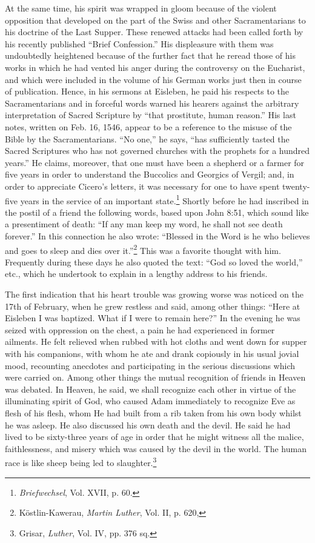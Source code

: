 At the same time, his spirit was wrapped in gloom because of the
violent opposition that developed on the part of the Swiss and other
Sacramentarians to his doctrine of the Last Supper. These renewed
attacks had been called forth by his recently published “Brief Confession.”
His displeasure with them was undoubtedly heightened because of the
further fact that he reread those of his works in which
he had vented his anger during the controversy on the Eucharist,
and which were included in the volume of his German works just then
in course of publication. Hence, in his sermons at Eisleben, he paid
his respects to the Sacramentarians and in forceful words warned
his hearers against the arbitrary interpretation of Sacred Scripture
by “that prostitute, human reason.” His last notes, written on Feb.
16, 1546, appear to be a reference to the misuse of the Bible by the
Sacramentarians. “No one,” he says, “has sufficiently tasted the Sacred
Scriptures who has not governed churches with the prophets for a
hundred years.” He claims, moreover, that one must have been a
shepherd or a farmer for five years in order to understand the Buccolics
and Georgics of Vergil; and, in order to appreciate Cicero’s letters,
it was necessary for one to have spent twenty-five years in the
service of an important state.\footnote{\textit{Briefwechsel}, Vol. XVII, p. 60.}
 Shortly before he had inscribed in the
postil of a friend the following words, based upon John 8:51,
which sound like a presentiment of death: “If any man keep my
word, he shall not see death forever.” In this connection he also
wrote: “Blessed in the Word is he who believes and goes to sleep and
dies over it.”\footnote{Köstlin-Kawerau, \textit{Martin Luther}, Vol. II, p. 620,}
 This was a favorite thought with him. Frequently
during these days he also quoted the text: “God so loved the world,”
etc., which he undertook to explain in a lengthy address to his friends.

The first indication that his heart trouble was growing worse was
noticed on the 17th of February, when he grew restless and said,
among other things: “Here at Eisleben I was baptized. What if I
were to remain here?” In the evening he was seized with oppression
on the chest, a pain he had experienced in former ailments. He felt
relieved when rubbed with hot cloths and went down for supper with
his companions, with whom he ate and drank copiously in his usual
jovial mood, recounting anecdotes and participating in the serious discussions
which were carried on. Among other things the mutual recognition
of friends in Heaven was debated. In Heaven, he said, we shall
recognize each other in virtue of the illuminating spirit of God, who
caused Adam immediately to recognize Eve as flesh of his flesh, whom
He had built from a rib taken from his own body whilst he was
asleep. He also discussed his own death and the devil. He said he had
lived to be sixty-three years of age in order that he might witness
all the malice, faithlessness, and misery which was caused by the devil
in the world. The human race is like sheep being led to slaughter.\footnote{Grisar, \textit{Luther}, Vol. IV, pp. 376 sq.}

